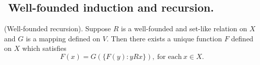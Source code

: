 
\subsection{${}$ \hspace{-1em}Well-founded induction and recursion.}



\begin{theorem}\label{WF-recursion}
{\rm (Well-founded recursion).} Suppose $R$ is a well-founded and set-like
relation on $X$ and $G$ is a mapping defined on $V$.
Then there exists a unique function $F$ defined on $X$ which satisfies
$$ %
 F(x) = G(\{F(y):y R x \}), \ \mbox{for each}\ x \in X.
$$ %
\end{theorem}

